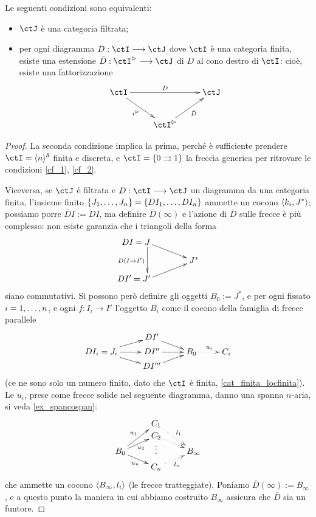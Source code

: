 \begin{theorem}\label{estensione_filtrata}
	Le seguenti condizioni sono equivalenti:
	\begin{itemize}
		\item \(\ctJ\) è una categoria filtrata;
		\item per ogni diagramma \(D : \ctI \fun\ctJ\) dove \(\ctI\) è una categoria finita, esiste una estensione \(\bar D : \ctI^\rhd \fun \ctJ\) di \(D\) al cono destro di \(\ctI\): cioè, esiste una fattorizzazione
		      \[\xymatrix{
			      \ctI \ar[rr]^D \ar[dr]_-{i^\rhd} && \ctJ \\
			      & \ctI^\rhd\ar[ur]_-{\bar D}
			      }\]
	\end{itemize}
\end{theorem}
\begin{proof}
	La seconda condizione implica la prima, perché è sufficiente prendere \(\ctI=\bkt{n}^\delta\) finita e discreta, e \(\ctI=\{0\toto 1\}\) la freccia generica per ritrovare le condizioni \ref{cf_1}, \ref{cf_2}.

	Viceversa, se \(\ctJ\) è filtrata e \(D : \ctI \fun\ctJ\) un diagramma da una categoria finita, l'insieme finito \(\{\tup Jn,\}=\{DI_1,\dots, DI_n\}\) ammette un cocono \(\langle k_i,J^*\rangle\); possiamo porre \(\bar D I := DI\), ma definire \(\bar D (\infty)\) e l'azione di \(\bar D\) sulle frecce è più complesso: non esiste garanzia che i triangoli della forma
	\[\xymatrix@R=3mm{
		**[l] DI=J\ar[dr]\ar[dd]_{D(I\to I')} \\
		&J^* \\
		**[l] DI'=J'\ar[ur]
		}\]
	siano commutativi. Si possono però definire gli oggetti \(B_0 := J^*\), e per ogni fissato \(i=\iter n\), e ogni \(f : I_i \to I'\) l'oggetto \(B_i\) come il cocono della famiglia di frecce parallele
	\[\xymatrix@R=1mm{
		&DI'\ar[dr]&\\
		DI_i = J_i\ar[ur]\ar[r]\ar[dr]& DI''\ar[r]& B_0 \ar@{.>}[r]^-{u_i} & C_i\\
		&DI'''\ar[ur]&
		}\]
	(ce ne sono solo un numero finito, dato che \(\ctI\) è finita, \ref{cat_finita_locfinita}). Le \(u_i\), prese come frecce solide nel seguente diagramma, danno una spanna \(n\)-aria, si veda \ref{ex_spancospan}:
	\[\xymatrix@R=0mm{
		& C_1\ar@{.>}[ddr]^{l_1}\\
		& C_2\ar@{.>}[dr]\\
		B_0 \ar[uur]^-{u_1}\ar[ur]_{u_2}\ar[dr]_-{u_n} & \vdots & B_\infty\\
		& C_n\ar@{.>}[ur]_{l_n}
		}\]
	che ammette un cocono \(\langle B_\infty,l_i\rangle\) (le frecce tratteggiate). Poniamo \(\bar D(\infty) := B_\infty\), e a questo punto la maniera in cui abbiamo costruito \(B_\infty\) assicura che \(\bar D\) sia un funtore.
\end{proof}
